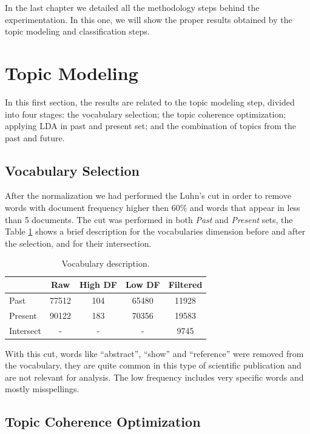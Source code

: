 In the last chapter we detailed all the methodology steps behind the experimentation. In this one, we will show the proper results obtained by the topic modeling and classification steps.

\section{Topic Modeling}

In this first section, the results are related to the topic modeling step, divided into four stages: the vocabulary selection; the topic coherence optimization; applying LDA in past and present set; and the combination of topics from the past and future.

\subsection{Vocabulary Selection}

After the normalization we had performed the Luhn's cut in order to remove words with document frequency higher then 60\% and words that appear in less than 5 documents. The cut was performed in both \textit{Past} and \textit{Present} sets, the Table \ref{tab:vocabulary} shows a brief description for the vocabularies dimension before and after the selection, and for their intersection.

\begin{table}[h!]
	\centering
	\caption{Vocabulary description.}
	\label{tab:vocabulary}
	\begin{tabular}{l|cccc}
		\toprule
		          &  \textbf{Raw}  & \textbf{High DF} & \textbf{Low DF} & \textbf{Filtered} \\ \midrule
		Past      & 77512 &   104   & 65480  &  11928   \\
		Present   & 90122 &   183   & 70356  &  19583   \\
		Intersect &   -   &    -    &   -    &   9745   \\ \bottomrule
	\end{tabular}
\end{table}

With this cut, words like ``abstract'', ``show'' and ``reference'' were removed from the vocabulary, they are quite common in this type of scientific publication and are not relevant for analysis. The low frequency includes very specific words and mostly misspellings. 

\subsection{Topic Coherence Optimization}

